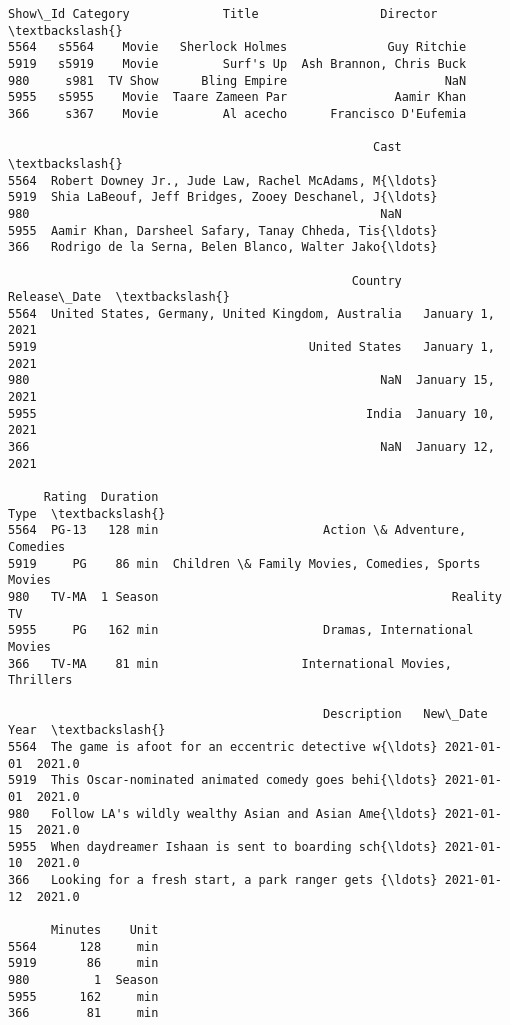 \documentclass[11pt]{article}
\makeatletter
\newcommand{\boxspacing}{\kern\kvtcb@left@rule\kern\kvtcb@boxsep}
\newcommand{\prompt}[4]{
        {\ttfamily\llap{{\color{#2}[#3]:\hspace{3pt}#4}}\vspace{-\baselineskip}}
    }
\makeatother
\begin{document}
            \begin{tcolorbox}[breakable, size=fbox, boxrule=.5pt, pad at break*=1mm, opacityfill=0]
\prompt{Out}{outcolor}{56}{\boxspacing}
\begin{Verbatim}[commandchars=\\\{\}]
     Show\_Id Category             Title                 Director  \textbackslash{}
5564   s5564    Movie   Sherlock Holmes              Guy Ritchie
5919   s5919    Movie         Surf's Up  Ash Brannon, Chris Buck
980     s981  TV Show      Bling Empire                      NaN
5955   s5955    Movie  Taare Zameen Par               Aamir Khan
366     s367    Movie         Al acecho      Francisco D'Eufemia

                                                   Cast  \textbackslash{}
5564  Robert Downey Jr., Jude Law, Rachel McAdams, M{\ldots}
5919  Shia LaBeouf, Jeff Bridges, Zooey Deschanel, J{\ldots}
980                                                 NaN
5955  Aamir Khan, Darsheel Safary, Tanay Chheda, Tis{\ldots}
366   Rodrigo de la Serna, Belen Blanco, Walter Jako{\ldots}

                                                Country      Release\_Date  \textbackslash{}
5564  United States, Germany, United Kingdom, Australia   January 1, 2021
5919                                      United States   January 1, 2021
980                                                 NaN  January 15, 2021
5955                                              India  January 10, 2021
366                                                 NaN  January 12, 2021

     Rating  Duration                                               Type  \textbackslash{}
5564  PG-13   128 min                       Action \& Adventure, Comedies
5919     PG    86 min  Children \& Family Movies, Comedies, Sports Movies
980   TV-MA  1 Season                                         Reality TV
5955     PG   162 min                       Dramas, International Movies
366   TV-MA    81 min                    International Movies, Thrillers

                                            Description   New\_Date    Year  \textbackslash{}
5564  The game is afoot for an eccentric detective w{\ldots} 2021-01-01  2021.0
5919  This Oscar-nominated animated comedy goes behi{\ldots} 2021-01-01  2021.0
980   Follow LA's wildly wealthy Asian and Asian Ame{\ldots} 2021-01-15  2021.0
5955  When daydreamer Ishaan is sent to boarding sch{\ldots} 2021-01-10  2021.0
366   Looking for a fresh start, a park ranger gets {\ldots} 2021-01-12  2021.0

      Minutes    Unit
5564      128     min
5919       86     min
980         1  Season
5955      162     min
366        81     min
\end{Verbatim}
\end{tcolorbox}
        
\end{document}
